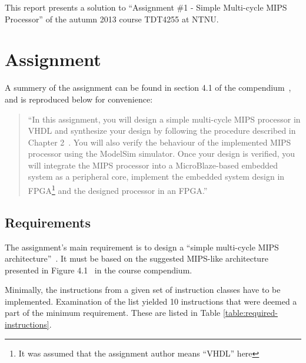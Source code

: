 This report presents a solution to ``Assignment \#1 - Simple Multi-cycle MIPS Processor'' of the autumn 2013 course TDT4255 at NTNU.

\section{Assignment}

A summery of the assignment can be found in section 4.1 of the compendium~\cite[p.114]{compendium}, and is reproduced below for convenience:

\begin{quote}
``In this assignment, you will design a simple multi-cycle MIPS processor in VHDL and synthesize your design by following the procedure described in Chapter 2~\cite[of the compendium]{compendium}.
You will also verify the behaviour of the implemented MIPS processor using the ModelSim simulator.
Once your design is verified, you will integrate the MIPS processor into a MicroBlaze-based embedded system as a peripheral core, implement the embedded system design in FPGA\footnote{It was assumed that the assignment author means ``VHDL'' here} and the designed processor in an FPGA.''
\end{quote}

\subsection{Requirements}

The assignment's main requirement is to design a ``simple multi-cycle MIPS architecture''~\cite[p.114]{compendium}. It must be based on the suggested MIPS-like architecture presented in Figure 4.1~\cite[p.115]{compendium} in the course compendium.

Minimally, the instructions from a given set of instruction classes have to be implemented. 
Examination of the list yielded 10 instructions that were deemed a part of the minimum requirement.
These are listed in Table \vref{table:required-instructions}.

